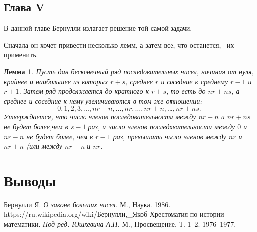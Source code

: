 \documentclass[12pt]{article}
\newtheorem{lemma}{Лемма}[section]
\begin{document}
\subsection{Глава V}
В данной главе Бернулли излагает решение той самой задачи.

Сначала он хочет привести несколько лемм, а затем все, что останется, --их применить.
\begin{lemma}
Пусть дан бесконечный ряд последовательных чисел, начиная от нуля, крайнее и наибольшее из которых $r+s$, среднее $r$ и соседние к среднему $r - 1$ и $r+1$. 
Затем ряд продолжается до кратного к $r+s$, то есть до $nr+ns$, а среднее и соседние к нему увеличиваются в том же отношении:
$$0, 1, 2, 3, \dots, nr-n, \dots, nr, \dots, nr+n, \dots, nr+ns.$$
Утверждается, что число членов последовательности между $nr+n$ и $nr+ns$ не будет более,чем в $s-1$ раз, и число членов последовательности между $0$ и $nr-n$ не будет более, чем в $r-1$ раз, превышать число членов между $nr$ и $nr+n$ (или между $nr-n$ и $nr$.
\end{lemma}


\newpage
\section{Выводы}

\newpage
\begin{thebibliography}{99}
 Бернулли Я. \textit{О законе больших чисел.} М., Наука. 1986.
 https://ru.wikipedia.org/wiki/Бернулли,\_Якоб
 Хрестоматия по истории математики. \textit{Под ред. Юшкевича А.П.} М., Просвещение. Т. 1–2. 1976–1977.

\end{thebibliography}
\end{document}

